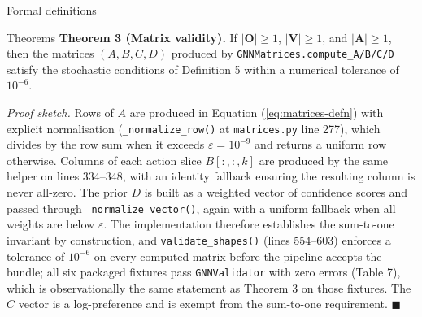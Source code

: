 \documentclass[
  ignorenonframetext,
]{beamer}
\begin{document}
\begin{frame}[fragile]{Formal definitions}
\begin{block}{Theorems}
\textbf{Theorem 3 (Matrix validity).} If \(|\mathbf{O}| \geq 1\),
\(|\mathbf{V}| \geq 1\), and \(|\mathbf{A}| \geq 1\), then the matrices
\((A, B, C, D)\) produced by \texttt{GNNMatrices.compute\_A/B/C/D}
satisfy the stochastic conditions of Definition 5 within a numerical
tolerance of \(10^{-6}\).

\emph{Proof sketch.} Rows of \(A\) are produced in Equation
(\ref{eq:matrices-defn}) with explicit normalisation
(\texttt{\_normalize\_row()} at \texttt{matrices.py} line 277), which
divides by the row sum when it exceeds \(\varepsilon = 10^{-9}\) and
returns a uniform row otherwise. Columns of each action slice
\(B[:,:,k]\) are produced by the same helper on lines 334--348, with an
identity fallback ensuring the resulting column is never all-zero. The
prior \(D\) is built as a weighted vector of confidence scores and
passed through \texttt{\_normalize\_vector()}, again with a uniform
fallback when all weights are below \(\varepsilon\). The implementation
therefore establishes the sum-to-one invariant by construction, and
\texttt{validate\_shapes()} (lines 554--603) enforces a tolerance of
\(10^{-6}\) on every computed matrix before the pipeline accepts the
bundle; all six packaged fixtures pass \texttt{GNNValidator} with zero
errors (Table 7), which is observationally the same statement as Theorem
3 on those fixtures. The \(C\) vector is a log-preference and is exempt
from the sum-to-one requirement. \(\blacksquare\)
\end{block}
\end{frame}
\end{document}
